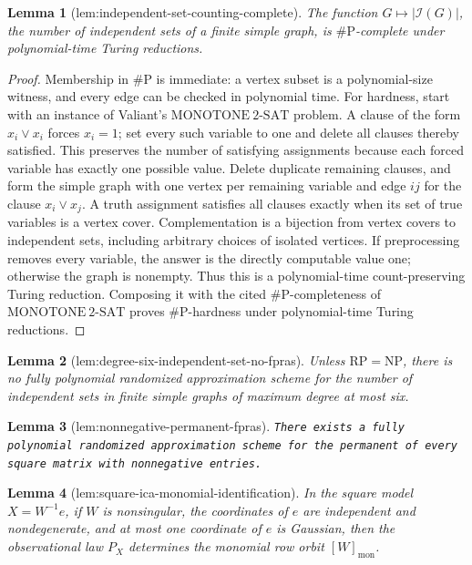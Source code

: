 \documentclass{article}
\newtheorem{lemma}{Lemma}
\begin{document}
\begin{lemma}[lem:independent-set-counting-complete]\label{lem:independent-set-counting-complete}
The function \(G\mapsto|\mathcal I(G)|\), the number of independent sets of a finite simple graph, is \(\#\mathrm P\)-complete under polynomial-time Turing reductions.
\end{lemma}
\begin{proof}
Membership in \(\#\mathrm P\) is immediate: a vertex subset is a polynomial-size witness, and every edge can be checked in polynomial time. For hardness, start with an instance of Valiant's \(\mathrm{MONOTONE\ 2\mbox{-}SAT}\) problem. A clause of the form \(x_i\vee x_i\) forces \(x_i=1\); set every such variable to one and delete all clauses thereby satisfied. This preserves the number of satisfying assignments because each forced variable has exactly one possible value. Delete duplicate remaining clauses, and form the simple graph with one vertex per remaining variable and edge \(ij\) for the clause \(x_i\vee x_j\). A truth assignment satisfies all clauses exactly when its set of true variables is a vertex cover. Complementation is a bijection from vertex covers to independent sets, including arbitrary choices of isolated vertices. If preprocessing removes every variable, the answer is the directly computable value one; otherwise the graph is nonempty. Thus this is a polynomial-time count-preserving Turing reduction. Composing it with the cited \(\#\mathrm P\)-completeness of \(\mathrm{MONOTONE\ 2\mbox{-}SAT}\) proves \(\#\mathrm P\)-hardness under polynomial-time Turing reductions.
\end{proof}

\begin{lemma}[lem:degree-six-independent-set-no-fpras]\label{lem:degree-six-independent-set-no-fpras}
Unless \(\mathrm{RP}=\mathrm{NP}\), there is no fully polynomial randomized approximation scheme for the number of independent sets in finite simple graphs of maximum degree at most six.
\end{lemma}

\begin{lemma}[lem:nonnegative-permanent-fpras]\label{lem:nonnegative-permanent-fpras}
\texttt{There exists a fully polynomial randomized approximation scheme for the permanent of every square matrix with nonnegative entries.}
\end{lemma}

\begin{lemma}[lem:square-ica-monomial-identification]\label{lem:square-ica-monomial-identification}
In the square model \(X=W^{-1}e\), if \(W\) is nonsingular, the coordinates of \(e\) are independent and nondegenerate, and at most one coordinate of \(e\) is Gaussian, then the observational law \(P_X\) determines the monomial row orbit \([W]_{\mathrm{mon}}\).
\end{lemma}
\end{document}
